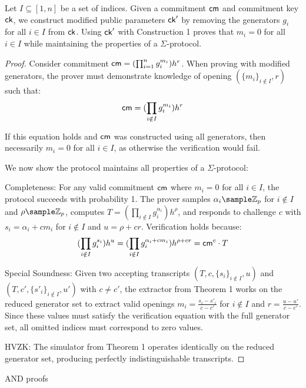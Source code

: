 {\begin{corollary}
    Let $I \subseteq [1,n]$ be a set of indices. Given a commitment $\mathsf{cm}$ and commitment key $\mathsf{ck}$, we construct modified public parameters $\mathsf{ck}'$ by removing the generators $g_i$ for all $i \in I$ from $\mathsf{ck}$. Using $\mathsf{ck}'$ with Construction 1 proves that $m_i = 0$ for all $i \in I$ while maintaining the properties of a $\Sigma$-protocol.
\end{corollary}

\begin{proof}
    Consider commitment $\mathsf{cm} = (\prod_{i=1}^n g_i^{m_i})h^r$. When proving with modified generators, the prover must demonstrate knowledge of opening $(\{m_i\}_{i \notin I}, r)$ such that:
    \[
    \mathsf{cm} = (\prod_{i \notin I} g_i^{m_i})h^r
    \]
    
    If this equation holds and $\mathsf{cm}$ was constructed using all generators, then necessarily $m_i = 0$ for all $i \in I$, as otherwise the verification would fail.

    We now show the protocol maintains all properties of a $\Sigma$-protocol:

    Completeness: For any valid commitment $\mathsf{cm}$ where $m_i = 0$ for all $i \in I$, the protocol succeeds with probability 1. The prover samples $\alpha_i \sample \Z_p$ for $i \notin I$ and $\rho \sample \Z_p$, computes $T = (\prod_{i \notin I} g_i^{\alpha_i})h^{\rho}$, and responds to challenge $c$ with $s_i = \alpha_i + cm_i$ for $i \notin I$ and $u = \rho + cr$. Verification holds because:
    \[
    (\prod_{i \notin I} g_i^{s_i})h^u = (\prod_{i \notin I} g_i^{\alpha_i + cm_i})h^{\rho + cr} = \mathsf{cm}^c \cdot T
    \]

    Special Soundness: Given two accepting transcripts $(T, c, \{s_i\}_{i \notin I}, u)$ and $(T, c', \{s'_i\}_{i \notin I}, u')$ with $c \neq c'$, the extractor from Theorem 1 works on the reduced generator set to extract valid openings $m_i = \frac{s_i-s'_i}{c-c'}$ for $i \notin I$ and $r = \frac{u-u'}{c-c'}$. Since these values must satisfy the verification equation with the full generator set, all omitted indices must correspond to zero values.

    HVZK: The simulator from Theorem 1 operates identically on the reduced generator set, producing perfectly indistinguishable transcripts.
\end{proof}


\begin{corollary}
    AND proofs
\end{corollary}




}
